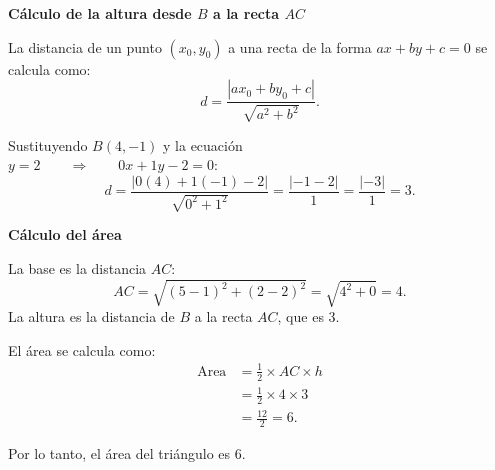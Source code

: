 \documentclass[11pt]{article}
\begin{document}
\begin{enumerate}[\hspace{-5mm} 1) ]
\begin{enumerate}[(a) ]
\textbf{Cálculo de la altura desde $B$ a la recta $AC$}

\bigskip

\begin{minipage}{.4\textwidth}
    

La distancia de un punto $(x_0, y_0)$ a una recta de la forma $ax + by + c = 0$ se calcula como:
\[
d = \frac{|ax_0 + by_0 + c|}{\sqrt{a^2 + b^2}}.
\]
\end{minipage}\quad\qquad\begin{minipage}{.47\textwidth}
    
Sustituyendo $B(4,-1)$ y la ecuación \\ $y = 2 \qquad\Longrightarrow\qquad 0x + 1y - 2 = 0$:
\[
d = \frac{|0(4) + 1(-1) - 2|}{\sqrt{0^2 + 1^2}} = \frac{|-1 - 2|}{1} = \frac{|-3|}{1} = 3.
\]

\end{minipage}

\bigskip 

\textbf{Cálculo del área}

\bigskip



\begin{minipage}{.6\textwidth}

La base es la distancia $AC$:
\[
AC = \sqrt{(5 - 1)^2 + (2 - 2)^2} = \sqrt{4^2 + 0} = 4.
\]
La altura es la distancia de $B$ a la recta $AC$, que es $3$.
\end{minipage}\quad\qquad\begin{minipage}{.3\textwidth}


El área se calcula como:
\begin{align*}
\text{Area} &= \frac{1}{2} \times AC \times h 
\\
&= \frac{1}{2} \times 4 \times 3 
\\
&= \frac{12}{2} = 6.
\end{align*} 
\end{minipage}

Por lo tanto, el área del triángulo es $6$.

\end{enumerate}
\end{enumerate}
\end{document}
